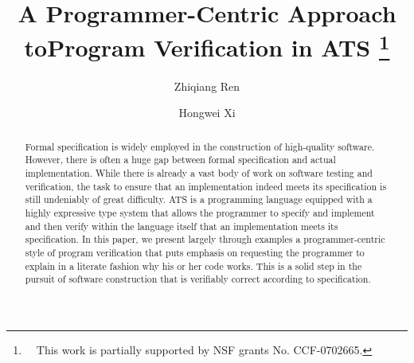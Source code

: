 \documentclass{llncs}
\date{}
\begin{document}
\title{%
A Programmer-Centric Approach to\break Program Verification in ATS%
\thanks{~~This work is partially supported by NSF grants No. CCF-0702665.}
} %
\author{Zhiqiang Ren \and Hongwei Xi}

\maketitle %

\begin{abstract}

Formal specification is widely employed in the construction of high-quality
software. However, there is often a huge gap between formal specification
and actual implementation. While there is already a vast body of work on
software testing and verification, the task to ensure that an
implementation indeed meets its specification is still undeniably of great
difficulty.  ATS is a programming language equipped with a highly
expressive type system that allows the programmer to specify and implement
and then verify within the language itself that an implementation meets its
specification.  In this paper, we present largely through examples a
programmer-centric style of program verification that puts emphasis on
requesting the programmer to explain in a literate fashion why his or her
code works. This is a solid step in the pursuit of software construction
that is verifiably correct according to specification.

\end{abstract}


\setcounter{page}{1}

\baselineskip=12pt
\end{document}
